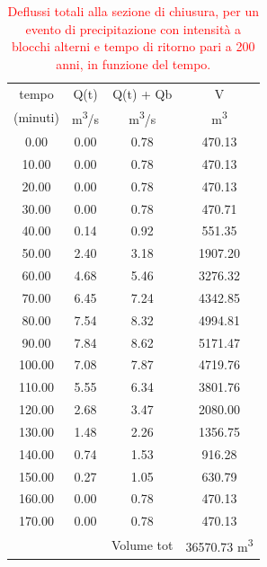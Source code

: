 \begin{table}[H] \centering
    \caption{\textcolor{red}{Deflussi totali alla sezione di chiusura, per un evento di precipitazione con intensità a blocchi alterni e tempo di ritorno pari a 200 anni, in funzione del tempo.}}
        \begin{tabular}{cccc}
        \toprule
        tempo        & Q(t)       & Q(t) + Qb  & V        \\
        (minuti)     & \unit{m^3/s}  & \unit{m^3/s} & \unit{m^3}\\
        \midrule
        0.00         & 0.00       & 0.78       & 470.13   \\
        10.00        & 0.00       & 0.78       & 470.13   \\
        20.00        & 0.00       & 0.78       & 470.13   \\
        30.00        & 0.00       & 0.78       & 470.71   \\
        40.00        & 0.14       & 0.92       & 551.35   \\
        50.00        & 2.40       & 3.18       & 1907.20  \\
        60.00        & 4.68       & 5.46       & 3276.32  \\
        70.00        & 6.45       & 7.24       & 4342.85  \\
        80.00        & 7.54       & 8.32       & 4994.81  \\
        90.00        & 7.84       & 8.62       & 5171.47  \\
        100.00       & 7.08       & 7.87       & 4719.76  \\
        110.00       & 5.55       & 6.34       & 3801.76  \\
        120.00       & 2.68       & 3.47       & 2080.00  \\
        130.00       & 1.48       & 2.26       & 1356.75  \\
        140.00       & 0.74       & 1.53       & 916.28   \\
        150.00       & 0.27       & 1.05       & 630.79   \\
        160.00       & 0.00       & 0.78       & 470.13   \\
        170.00       & 0.00       & 0.78       & 470.13   \\
                     &            & Volume tot & 36570.73 \unit{m^3} \\
        \bottomrule
        \end{tabular}
        \end{table}

